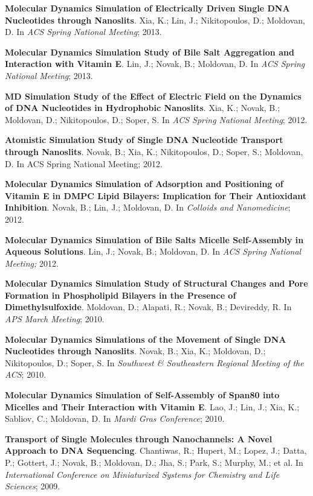 \begin{cventries}
{\begin{cvitems}
        \item {\textbf{Molecular Dynamics Simulation of Electrically Driven Single DNA Nucleotides through Nanoslits}. Xia, K.; Lin, J.; Nikitopoulos, D.; Moldovan, D. In \textit{ACS Spring National Meeting}; 2013.}
        \item {\textbf{Molecular Dynamics Simulation Study of Bile Salt Aggregation and Interaction with Vitamin E}. Lin, J.; Novak, B.; Moldovan, D. In \textit{ACS Spring National Meeting}; 2013.}
        \item {\textbf{MD Simulation Study of the Effect of Electric Field on the Dynamics of DNA Nucleotides in Hydrophobic Nanoslits}. Xia, K.; Novak, B.; Moldovan, D.; Nikitopoulos, D.; Soper, S. In \textit{ACS Spring National Meeting}; 2012.}
        \item {\textbf{Atomistic Simulation Study of Single DNA Nucleotide Transport through Nanoslits}. Novak, B.; Xia, K.; Nikitopoulos, D.; Soper, S.; Moldovan, D. In ACS Spring National Meeting; 2012.}
        \item {\textbf{Molecular Dynamics Simulation of Adsorption and Positioning of Vitamin E in DMPC Lipid Bilayers: Implication for Their Antioxidant Inhibition}. Novak, B.; Lin, J.; Moldovan, D. In \textit{Colloids and Nanomedicine}; 2012.}
        \item {\textbf{Molecular Dynamics Simulation of Bile Salts Micelle Self-Assembly in Aqueous Solutions}. Lin, J.; Novak, B.; Moldovan, D. In \textit{ACS Spring National Meeting;} 2012.}
        \item {\textbf{Molecular Dynamics Simulation Study of Structural Changes and Pore Formation in Phospholipid Bilayers in the Presence of Dimethylsulfoxide}. Moldovan, D.; Alapati, R.; Novak, B.; Devireddy, R. In \textit{APS March Meeting}; 2010.}
        \item {\textbf{Molecular Dynamics Simulations of the Movement of Single DNA Nucleotides through Nanoslits}. Novak, B.; Xia, K.; Moldovan, D.; Nikitopoulos, D.; Soper, S. In \textit{Southwest \& Southeastern Regional Meeting of the ACS}; 2010.}
        \item {\textbf{Molecular Dynamics Simulation of Self-Assembly of Span80 into Micelles and Their Interaction with Vitamin E}. Lao, J.; Lin, J.; Xia, K.; Sabliov, C.; Moldovan, D. In \textit{Mardi Gras Conference}; 2010.}
        \item {\textbf{Transport of Single Molecules through Nanochannels: A Novel Approach to DNA Sequencing}. Chantiwas, R.; Hupert, M.; Lopez, J.; Datta, P.; Gottert, J.; Novak, B.; Moldovan, D.; Jha, S.; Park, S.; Murphy, M.; et al. In \textit{International Conference on Miniaturized Systems for Chemistry and Life Sciences}; 2009.}
      \end{cvitems}
    }
    
\end{cventries}
